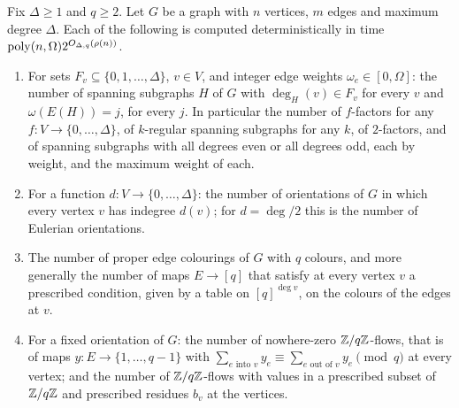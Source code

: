 \begin{theorem}\label{thm:edges}
Fix $\Delta\ge1$ and $q\ge2$. Let $G$ be a graph with $n$ vertices, $m$ edges and
maximum degree $\Delta$. Each of the following is computed deterministically in
time $\operatorname{poly}(n,\Omega)2^{O_{\Delta,q}(\rho(n))}$.
\begin{enumerate}[label=\textup{(\roman*)},leftmargin=2.2em]
\item\label{it:factors} For sets $F_v\subseteq\{0,1,\dots,\Delta\}$, $v\in V$, and
integer edge weights $\omega_e\in[0,\Omega]$: the number of spanning subgraphs
$H$ of $G$ with $\deg_H(v)\in F_v$ for every $v$ and $\omega(E(H))=j$, for every
$j$. In particular the number of $f$-factors for any $f:V\to\{0,\dots,\Delta\}$,
of $k$-regular spanning subgraphs for any $k$, of $2$-factors, and of spanning
subgraphs with all degrees even or all degrees odd, each by weight, and the
maximum weight of each.
\item\label{it:orient} For a function $d:V\to\{0,\dots,\Delta\}$: the number of
orientations of $G$ in which every vertex $v$ has indegree $d(v)$; for
$d=\deg/2$ this is the number of Eulerian orientations.
\item\label{it:edgecol} The number of proper edge colourings of $G$ with $q$
colours, and more generally the number of maps $E\to[q]$ that satisfy at every
vertex $v$ a prescribed condition, given by a table on $[q]^{\deg v}$, on the
colours of the edges at $v$.
\item\label{it:flows} For a fixed orientation of $G$: the number of nowhere-zero
$\mathbb{Z}/q\mathbb{Z}$-flows, that is of maps $y:E\to\{1,\dots,q-1\}$ with
$\sum_{e\text{ into }v}y_e\equiv\sum_{e\text{ out of }v}y_e\pmod q$ at every
vertex; and the number of $\mathbb{Z}/q\mathbb{Z}$-flows with values in a prescribed subset of
$\mathbb{Z}/q\mathbb{Z}$ and prescribed residues $b_v$ at the vertices.
\end{enumerate}
\end{theorem}


